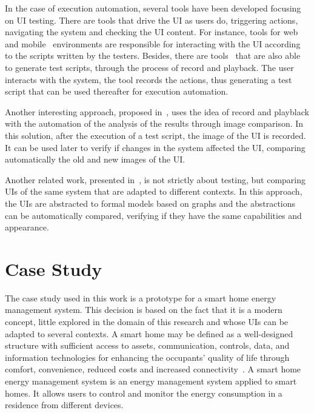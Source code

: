 \documentclass{chi-ext}
\begin{document}
In the case of execution automation, several tools have been developed focusing on UI testing. There are tools that drive the UI as users do, triggering actions, navigating the system and checking the UI content. For instance, tools for web~\cite{watir, cucumber} and mobile~\cite{appium, selendroid} environments are responsible for interacting with the UI according to the scripts written by the testers. Besides, there are tools~\cite{selenium, monkeytalk} that are also able to generate test scripts, through the process of record and playback. The user interacts with the system, the tool records the actions, thus generating a test script that can be used thereafter for execution automation.

Another interesting approach, proposed in~\cite{test-image-comparison-korea}, uses the idea of record and playblack with the automation of the analysis of the results through image comparison. In this solution, after the execution of a test script, the image of the UI is recorded. It can be used later to verify if changes in the system affected the UI, comparing automatically the old and new images of the UI.
 
Another related work, presented in~\cite{ui-equilavance-raquel}, is not strictly about testing, but comparing UIs of the same system that are adapted to different contexts. In this approach, the UIs are abstracted to formal models based on graphs and the abstractions can be automatically compared, verifying if  they have the same capabilities and appearance.

\section{Case Study}
The case study used in this work is a prototype for a smart home energy management system. This decision is based on the fact that it is a modern concept, little explored in the domain of this research and whose UIs can be adapted to several contexts. A smart home may be defined as a well-designed structure with sufficient access to assets, communication, controls, data, and information technologies for enhancing the occupants' quality of life through comfort, convenience, reduced costs and increased connectivity~\cite{smart-home-harper}. A smart home energy management system is an energy management system applied to smart homes. It allows users to control and monitor the energy consumption in a residence from different devices. 
\end{document}
